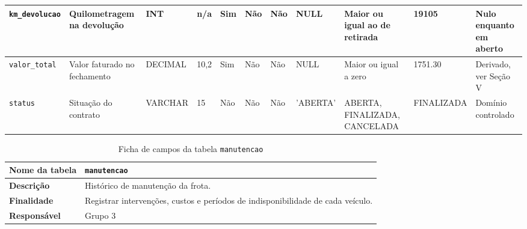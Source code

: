 \begin{table}[!t]
\begin{tabular}{|L{2.15cm}|L{2.7cm}|L{1.15cm}|C{0.62cm}|C{0.62cm}|C{0.5cm}|C{0.5cm}|L{1.45cm}|L{2.6cm}|L{2.0cm}|L{1.85cm}|}
\hline
\texttt{km\_\allowbreak{}devolucao} & Quilometragem na devolu\c{c}\~ao & INT & n/a & Sim & N\~ao & N\~ao & NULL & Maior ou igual ao de retirada & 19105 & Nulo enquanto em aberto \\
\hline
\texttt{valor\_\allowbreak{}total} & Valor faturado no fechamento & DECIMAL & 10,2 & Sim & N\~ao & N\~ao & NULL & Maior ou igual a zero & 1751.30 & Derivado, ver Se\c{c}\~ao V \\
\hline
\texttt{status} & Situa\c{c}\~ao do contrato & VARCHAR & 15 & N\~ao & N\~ao & N\~ao & 'ABERTA' & ABERTA, FINALIZADA, CANCELADA & FINALIZADA & Dom\'inio controlado \\
\hline
\end{tabular}
\end{table}

\begin{table}[!t]
\caption{Ficha de campos da tabela \texttt{manutencao}}
\label{tab:f_manutencao}
\centering
\scriptsize
\setlength{\tabcolsep}{2pt}
\begin{tabular}{|L{3.2cm}|L{14.2cm}|}
\hline
\textbf{Nome da tabela} & \texttt{manutencao} \\
\hline
\textbf{Descri\c{c}\~ao} & Hist\'orico de manuten\c{c}\~ao da frota. \\
\hline
\textbf{Finalidade} & Registrar interven\c{c}\~oes, custos e per\'iodos de indisponibilidade de cada ve\'iculo. \\
\hline
\textbf{Respons\'avel} & Grupo 3 \\
\hline
\end{tabular}

\vspace{3pt}


\end{table}
